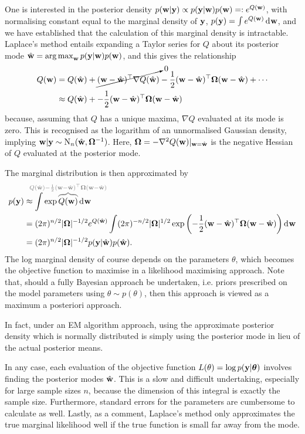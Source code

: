 One is interested in the posterior density $p({\mathbf w}|{\mathbf y}) \propto p({\mathbf y}|{\mathbf w})p({\mathbf w}) =: e^{Q({\mathbf w})}$, with normalising constant equal to the marginal density of ${\mathbf y}$, $p({\mathbf y}) = \int e^{Q({\mathbf w})} \operatorname{d}\hspace{0.5pt}\! {\mathbf w}$, and we have established that the calculation of this marginal density is intractable.
Laplace's method \citep[§4.1.1, pp. 777--778]{kass1995bayes} entails expanding a Taylor series for $Q$ about its posterior mode $\hat{{\mathbf w}} = \operatorname*{arg\,max}_{\mathbf w} p({\mathbf y}|{\mathbf w})p({\mathbf w})$, and this gives the relationship
\begin{align*}
  Q({\mathbf w}) 
  &= Q(\hat{{\mathbf w}}) + 
  \cancelto{0}{({\mathbf w} - \hat{{\mathbf w}})^\top \nabla Q(\hat{{\mathbf w}})} 
  - \frac{1}{2} ({\mathbf w} - \hat{{\mathbf w}})^\top {\bm\Omega} ({\mathbf w} - \hat{{\mathbf w}}) + \cdots \\
  &\approx Q(\hat{{\mathbf w}}) + 
  - \frac{1}{2} ({\mathbf w} - \hat{{\mathbf w}})^\top {\bm\Omega} ({\mathbf w} - \hat{{\mathbf w}})
\end{align*}
because, assuming that $Q$ has a unique maxima, $\nabla Q$ evaluated at its mode is zero.
This is recognised as the logarithm of an unnormalised Gaussian density, implying ${\mathbf w}|{\mathbf y} \sim \operatorname{N}_n(\hat{{\mathbf w}},{\bm\Omega}^{-1})$.
Here, ${\bm\Omega} = -\nabla^2 Q({\mathbf w})|_{{\mathbf w}=\hat{{\mathbf w}}}$ is the negative Hessian of $Q$ evaluated at the posterior mode.

The marginal distribution is then approximated by
\begin{align*}
  p(\by) 
  &\approx \int \exp
  \greyoverbrace{Q(\bw)}{\hidewidth Q(\hat\bw) - \half (\bw - \hat\bw)^\top \bOmega (\bw - \hat\bw)\hidewidth}
   \dint \bw \\
  &= (2\pi)^{n/2} \abs{\bOmega}^{-1/2} e^{Q(\hat\bw)} 
  \int (2\pi)^{-n/2} \abs{\bOmega}^{1/2} \exp \left(- \half (\bw - \hat\bw)^\top \bOmega (\bw - \hat\bw) \right) \dint\bw \\
  &= (2\pi)^{n/2} \abs{\bOmega}^{-1/2} p(\by|\hat\bw)p(\hat\bw).
\end{align*} 
The log marginal density of course depends on the parameters $\theta$, which becomes the objective function to maximise in a likelihood maximising approach.
Note that, should a fully Bayesian approach be undertaken, i.e. priors prescribed on the model parameters using $\theta \sim p(\theta)$, then this approach is viewed as a maximum a posteriori approach.

In fact, under an EM algorithm approach, using the approximate posterior density which is normally distributed is simply using the posterior mode in lieu of the actual posterior means.

In any case, each evaluation of the objective function $L(\theta) = \log p({\mathbf y}|{\bm\theta})$ involves finding the posterior modes $\hat{{\mathbf w}}$.
This is a slow and difficult undertaking, especially for large sample sizes $n$, because the dimension of this integral is exactly the sample size.
Furthermore, standard errors for the parameters are cumbersome to calculate as well.
Lastly, as a comment, Laplace's method only approximates the true marginal likelihood well if the true function is small far away from the mode.

